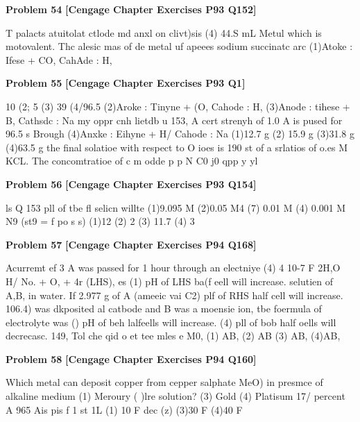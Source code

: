 \begin{problembox}
\textbf{Problem 54} \hfill \textbf{[Cengage Chapter Exercises P93 Q152]}
\label{q:ext-cng-th-54}

T palacts atuitolat ctlode md anxl on clivt)sis
(4) 44.S mL
Metul which is motovalent. Thc alesic mas of de metal
uf apeees sodium succinatc arc
(1)Atoke : Ifese + CO, CahAde : H,
\end{problembox}

\begin{problembox}
\textbf{Problem 55} \hfill \textbf{[Cengage Chapter Exercises P93 Q1]}
\label{q:ext-cng-th-55}

10
(2; 5
(3) 39
(4/96.5
(2)Aroke : Tinyne + (O, Cahode : H,
(3)Anode : tihese + B, Cathsdc : Na
my  oppr cnh lietdb u
153, A cert strenyh of 1.0 A is pused for 96.5 s Brough
(4)Anxke : Eihyne + H/ Cahode : Na
(1)12.7 g
(2) 15.9 g
(3)31.8 g
(4)63.5 g
the final solatioe with respect to O ioes is
190 st of a srlatios of o.es M KCL. The concomtratioe of
c m odde p p N C0 j0 qpp
y  yl
\end{problembox}

\begin{problembox}
\textbf{Problem 56} \hfill \textbf{[Cengage Chapter Exercises P93 Q154]}
\label{q:ext-cng-th-56}

ls Q 153 pll of tbe fl selicn willte
(1)9.095 M (2)0.05 M4
(7) 0.01 M
(4) 0.001 M
N9 (st9 = f po s s)
(1)12
(2) 2
(3) 11.7
(4) 3
\end{problembox}

\begin{problembox}
\textbf{Problem 57} \hfill \textbf{[Cengage Chapter Exercises P94 Q168]}
\label{q:ext-cng-th-57}

Acurremt ef 3 A was passed for 1 hour through an electniye
(4) 4   10-7 F
2H,O   H/ No.  + O, + 4r  (LHS), es
(1) pH of LHS ba(f eell will increase.
selutien of A,B, in water. If 2.977 g of A (ameeic vai 
C2) plf of RHS half cell will increase.
106.4) was dkposited al catbode and B was a moensie
ion, tbe foermula of electrolyte was
() pH of beh lalfeells will increase.
(4) pll of bob half oells will decrecasc.
149, Tol che qid o et tee mles e M0,
(1) AB,
(2) AB
(3) AB,
(4)AB,
\end{problembox}

\begin{problembox}
\textbf{Problem 58} \hfill \textbf{[Cengage Chapter Exercises P94 Q160]}
\label{q:ext-cng-th-58}

Which metal can deposit copper from cepper salphate
MeO) in presmce of alkaline medium
(1) Meroury ( )lre
solution?
(3) Gold
(4) Platisum
17/ percent  A 965 Ais pis f 1 st 1L 
(1) 10 F
dec (z)
(3)30 F
(4)40 F
\end{problembox}

